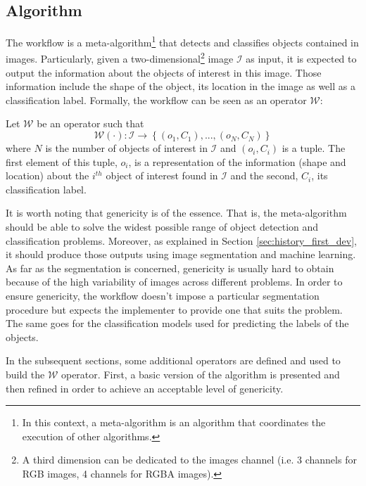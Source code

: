\subsection{Algorithm}
\label{ssec:workflow_algo}
The workflow is a meta-algorithm\footnote{In this context, a meta-algorithm is an algorithm that coordinates the execution of other algorithms.} that detects and classifies objects contained in images. Particularly, given a two-dimensional\footnote{A third dimension can be dedicated to the images channel (i.e. 3 channels for RGB images, 4 channels for RGBA images).} image $\mathcal{I}$ as input, it is expected to output the information about the objects of interest in this image. Those information include the shape of the object, its location in the image as well as a classification label. Formally, the workflow can be seen as an operator $\mathcal{W}$:

\begin{definition} Let $\mathcal{W}$ be an operator such that 
	\begin{equation}\label{eqn:workflow_operator}
		\mathcal{W}(\cdot) : \mathcal{I} \rightarrow \left\{(o_1,C_1),...,(o_N, C_N)\right\}
	\end{equation}
	where $N$ is the number of objects of interest in $\mathcal{I}$ and $(o_i, C_i)$ is a tuple. The first element of this tuple, $o_i$, is a representation of the information (shape and location) about the $i^{th}$ object of interest found in $\mathcal{I}$ and the second, $C_i$, its classification label. 
\end{definition}

It is worth noting that genericity is of the essence. That is, the meta-algorithm should be able to solve the widest possible range of object detection and classification problems. Moreover, as explained in Section \ref{sec:history_first_dev}, it should produce those outputs using image segmentation and machine learning. As far as the segmentation is concerned, genericity is usually hard to obtain because of the high variability of images across different problems. In order to ensure genericity, the workflow doesn't impose a particular segmentation procedure but expects the implementer to provide one that suits the problem. The same goes for the classification models used for predicting the labels of the objects. 

In the subsequent sections, some additional operators are defined and used to build the $\mathcal{W}$ operator. First, a basic version of the algorithm is presented and then refined in order to achieve an acceptable level of genericity.


